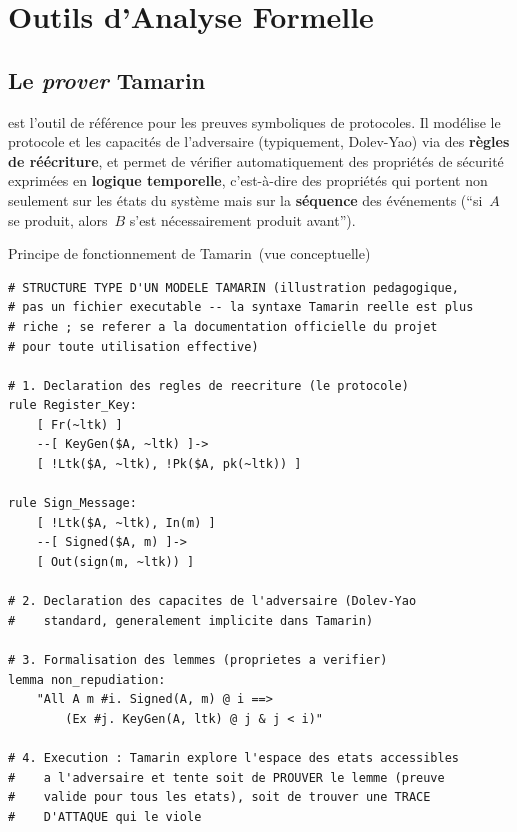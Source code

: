 \section{Outils d'Analyse Formelle}
\label{sec:outils-formels}

\subsection{Le \textit{prover} Tamarin}

 est l'outil de
référence pour les preuves symboliques de protocoles. Il modélise
le protocole et les capacités de l'adversaire (typiquement,
Dolev-Yao) via des \textbf{règles de réécriture}, et permet de
vérifier automatiquement des propriétés de sécurité exprimées en
\textbf{logique temporelle}, c'est-à-dire des propriétés qui
portent non seulement sur les états du système mais sur la
\textbf{séquence} des événements (``si~$A$ se produit, alors~$B$
s'est nécessairement produit avant'').

\begin{boxoutils}{Principe de fonctionnement de Tamarin~(vue conceptuelle)}
\begin{lstlisting}[language=bash_forensique]
# STRUCTURE TYPE D'UN MODELE TAMARIN (illustration pedagogique,
# pas un fichier executable -- la syntaxe Tamarin reelle est plus
# riche ; se referer a la documentation officielle du projet
# pour toute utilisation effective)

# 1. Declaration des regles de reecriture (le protocole)
rule Register_Key:
    [ Fr(~ltk) ]
    --[ KeyGen($A, ~ltk) ]->
    [ !Ltk($A, ~ltk), !Pk($A, pk(~ltk)) ]

rule Sign_Message:
    [ !Ltk($A, ~ltk), In(m) ]
    --[ Signed($A, m) ]->
    [ Out(sign(m, ~ltk)) ]

# 2. Declaration des capacites de l'adversaire (Dolev-Yao
#    standard, generalement implicite dans Tamarin)

# 3. Formalisation des lemmes (proprietes a verifier)
lemma non_repudiation:
    "All A m #i. Signed(A, m) @ i ==>
        (Ex #j. KeyGen(A, ltk) @ j & j < i)"

# 4. Execution : Tamarin explore l'espace des etats accessibles
#    a l'adversaire et tente soit de PROUVER le lemme (preuve
#    valide pour tous les etats), soit de trouver une TRACE
#    D'ATTAQUE qui le viole
\end{lstlisting}
\end{boxoutils}

